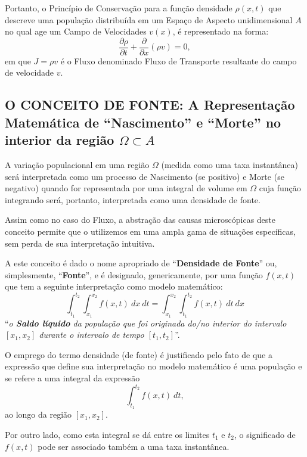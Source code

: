 Portanto, o Princípio de Conservação para a função densidade \(\rho(x,t)\) que descreve uma população distribuída em um Espaço de Aspecto unidimensional \(A\) no qual age um Campo de Velocidades \(v(x)\), é representado na forma:
\[\dfrac{\partial \rho}{\partial t} + \dfrac{\partial }{\partial x}(\rho v)= 0,\]
em que \(J = \rho v\) é o Fluxo denominado Fluxo de Transporte resultante do campo de velocidade \(v\).



\subsection{O CONCEITO DE FONTE: A Representação Matemática de ``Nascimento'' e ``Morte'' no interior da região \(\Omega \subset A\)}

A variação populacional em uma região \(\Omega\) (medida como uma taxa instantânea) será interpretada como um processo de Nascimento (se positivo) e Morte (se negativo) quando for representada por uma integral de volume em \(\Omega\) cuja função integrando será, portanto, interpretada como uma densidade de fonte.


Assim como no caso do Fluxo, a abstração das causas microscópicas deste conceito permite que o utilizemos em uma ampla gama de situações específicas, sem perda de sua interpretação intuitiva.

A este conceito é dado o nome apropriado de ``\textbf{Densidade de Fonte}'' ou, simplesmente, ``\textbf{Fonte}'', e é designado, genericamente, por uma função \(f(x,t)\) que tem a seguinte interpretação como modelo matemático:
\[
\displaystyle\int_{t_1}^{t_2}\int_{x_1}^{x_2} f(x,t)\ dx\ dt =
\displaystyle\int_{x_1}^{x_2}\int_{t_1}^{t_2} f(x,t)\ dt\ dx
\]
``\textit{o \textbf{Saldo líquido} da população que foi originada do/no interior do intervalo \([x_1, x_2]\) durante o intervalo de tempo \([t_1, t_2]\)}''.

O emprego do termo densidade (de fonte) é justificado pelo fato de que a expressão que define sua interpretação no modelo matemático é uma população e se refere a uma integral da expressão
\[\displaystyle\int_{t_1}^{t_2} f(x,t)\ dt,\]
ao longo da região \([x_1, x_2]\).

Por outro lado, como esta integral se dá entre os limites \(t_1\) e \(t_2\), o significado de \(f(x,t)\) pode ser associado também a uma taxa instantânea.

